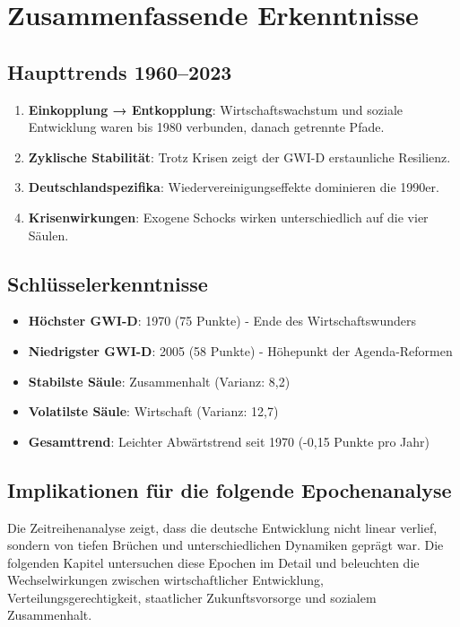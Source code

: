 \section{Zusammenfassende Erkenntnisse}

\subsection{Haupttrends 1960--2023}

\begin{enumerate}
\item \textbf{Einkopplung → Entkopplung}: Wirtschaftswachstum und soziale Entwicklung waren bis 1980 verbunden, danach getrennte Pfade.
\item \textbf{Zyklische Stabilität}: Trotz Krisen zeigt der GWI-D erstaunliche Resilienz.
\item \textbf{Deutschlandspezifika}: Wiedervereinigungseffekte dominieren die 1990er.
\item \textbf{Krisenwirkungen}: Exogene Schocks wirken unterschiedlich auf die vier Säulen.
\end{enumerate}

\subsection{Schlüsselerkenntnisse}

\begin{itemize}
\item \textbf{Höchster GWI-D}: 1970 (75 Punkte) - Ende des Wirtschaftswunders
\item \textbf{Niedrigster GWI-D}: 2005 (58 Punkte) - Höhepunkt der Agenda-Reformen
\item \textbf{Stabilste Säule}: Zusammenhalt (Varianz: 8,2)
\item \textbf{Volatilste Säule}: Wirtschaft (Varianz: 12,7)
\item \textbf{Gesamttrend}: Leichter Abwärtstrend seit 1970 (-0,15 Punkte pro Jahr)
\end{itemize}

\subsection{Implikationen für die folgende Epochenanalyse}

Die Zeitreihenanalyse zeigt, dass die deutsche Entwicklung nicht linear verlief, sondern von tiefen Brüchen und unterschiedlichen Dynamiken geprägt war. Die folgenden Kapitel untersuchen diese Epochen im Detail und beleuchten die Wechselwirkungen zwischen wirtschaftlicher Entwicklung, Verteilungsgerechtigkeit, staatlicher Zukunftsvorsorge und sozialem Zusammenhalt.